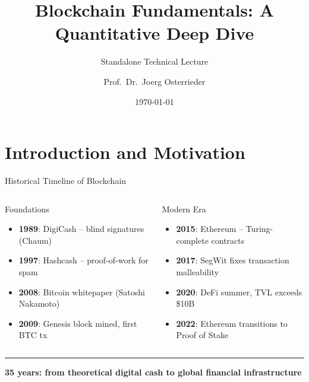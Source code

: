 \documentclass[8pt,aspectratio=169]{beamer}
\title{Blockchain Fundamentals: A Quantitative Deep Dive}
\subtitle{Standalone Technical Lecture}
\author{Prof.~Dr.~Joerg Osterrieder}
\institute{University Lecture Series}
\date{\today}
\newcommand{\bottomnote}[1]{\vfill\vspace{-2mm}\textcolor{mllavender2}{\rule{\textwidth}{0.4pt}}\vspace{1mm}\footnotesize\textbf{#1}}
\begin{document}
\begin{frame}
\titlepage
\end{frame}

\section{Introduction and Motivation}

\begin{frame}{Historical Timeline of Blockchain}
\vspace{1mm}
\begin{columns}
\begin{block}{Foundations}
\begin{itemize}\small
  \item \textbf{1989}: DigiCash -- blind signatures (Chaum)
  \item \textbf{1997}: Hashcash -- proof-of-work for spam
  \item \textbf{2008}: Bitcoin whitepaper (Satoshi Nakamoto)
  \item \textbf{2009}: Genesis block mined, first BTC tx
\end{itemize}
\end{block}
\begin{block}{Modern Era}
\begin{itemize}\small
  \item \textbf{2015}: Ethereum -- Turing-complete contracts
  \item \textbf{2017}: SegWit fixes transaction malleability
  \item \textbf{2020}: DeFi summer, TVL exceeds \$10B
  \item \textbf{2022}: Ethereum transitions to Proof of Stake
\end{itemize}
\end{block}
\end{columns}
\bottomnote{35 years: from theoretical digital cash to global financial infrastructure}
\end{frame}
\end{document}
